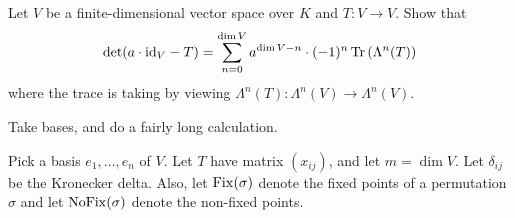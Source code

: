 


\begin{problem}
	\yod
	Let $V$ be a finite-dimensional vector space over $K$ and $T : V \to V$.
	Show that
	\[
		\det(a \cdot \mathrm{id}_V - T) =
		\sum_{n=0}^{\dim V} a^{\dim V-n} \cdot (-1)^n
		\operatorname{Tr}\left( \Lambda^n(T) \right)
	\]
	where the trace is taking by viewing $\Lambda^n(T) : \Lambda^n(V) \to \Lambda^n(V)$.
	\begin{hint}
		Take bases, and do a fairly long calculation.
	\end{hint}
	\begin{sol}
		\newcommand{\Fix}{\opname{Fix}}
		\newcommand{\NoFix}{\opname{NoFix}}
		Pick a basis $e_1, \dots, e_n$ of $V$.
		Let $T$ have matrix $(x_{ij})$, and let $m = \dim V$.
		Let $\delta_{ij}$ be the Kronecker delta.
		Also, let $\Fix(\sigma)$ denote the fixed points of a permutation $\sigma$
		and let $\NoFix(\sigma)$ denote the non-fixed points.


\end{sol}
\end{problem}
